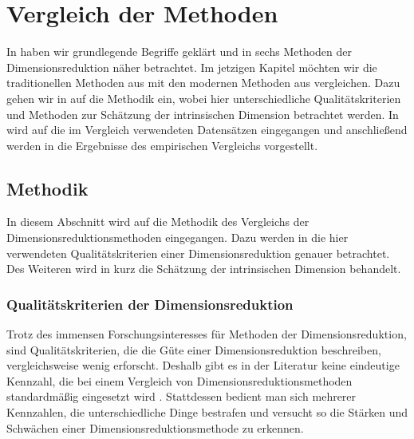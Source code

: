 \chapter{Vergleich der Methoden}
\label{ch:Vergleich}

In  haben wir grundlegende Begriffe geklärt und in
 sechs Methoden der Dimensionsreduktion näher betrachtet. Im jetzigen
Kapitel möchten wir die traditionellen Methoden aus  mit
den modernen Methoden aus  vergleichen. Dazu gehen wir in
 auf die Methodik ein, wobei hier unterschiedliche
Qualitätskriterien und Methoden zur Schätzung der intrinsischen Dimension betrachtet werden. In
 wird auf die im Vergleich verwendeten Datensätzen
eingegangen und anschließend werden in  die Ergebnisse des
empirischen Vergleichs vorgestellt.

\section{Methodik}
\label{ch:Vergleich:sec:Methodik}

In diesem Abschnitt wird auf die Methodik des Vergleichs der Dimensionsreduktionsmethoden
eingegangen. Dazu werden in  die
hier verwendeten Qualitätskriterien einer Dimensionsreduktion genauer betrachtet. Des Weiteren wird
in  kurz die Schätzung der
intrinsischen Dimension behandelt. 
\subsection{Qualitätskriterien der Dimensionsreduktion}
\label{ch:Vergleich:sec:Methodik:subsec:Qualitaetskriterien}
Trotz des immensen Forschungsinteresses für Methoden der Dimensionsreduktion, sind Qualitätskriterien, die die Güte einer Dimensionsreduktion beschreiben, vergleichsweise wenig erforscht. Deshalb gibt es in der Literatur keine eindeutige Kennzahl, die bei einem Vergleich von Dimensionsreduktionsmethoden standardmäßig eingesetzt wird \parencite[vgl.][1 -- 2]{Lee.2009}. Stattdessen bedient man sich mehrerer Kennzahlen, die
unterschiedliche Dinge bestrafen und versucht so die Stärken und Schwächen einer
Dimensionsreduktionsmethode \parencite[486]{Venna.2001} zu erkennen.

